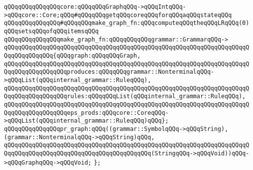 \verb|qQQqqQQqqQQqqQQqcore:qQQqqQQqGraphqQQq->qQQqIntqQQq->qQQqcore::Core;qQQq#qQQqqQQqgetqQQqcoreqQQqforqQQqaqQQqstateqQQq|\newline
\newline
\verb|qQQqqQQqqQQqqQQq#qQQqqQQqmake_graph_fn:qQQqcomputeqQQqtheqQQqLRqQQq(0)qQQqsetsqQQqofqQQqitemsqQQq|\newline
\newline
\verb|qQQqqQQqqQQqqQQqmake_graph_fn:qQQqqQQqqQQqgrammar::GrammarqQQq->|\newline
\verb|qQQqqQQqqQQqqQQqqQQqqQQqqQQqqQQqqQQqqQQqqQQqqQQqqQQqqQQqqQQqqQQqqQQqqQQqqQQqqQQqqQQq{qQQqgraph:qQQqqQQqGraph,|\newline
\verb|qQQqqQQqqQQqqQQqqQQqqQQqqQQqqQQqqQQqqQQqqQQqqQQqqQQqqQQqqQQqqQQqqQQqqQQqqQQqqQQqqQQqqQQqproduces:qQQqqQQqgrammar::NonterminalqQQq->qQQqList(qQQqinternal_grammar::RuleqQQq),|\newline
\verb|qQQqqQQqqQQqqQQqqQQqqQQqqQQqqQQqqQQqqQQqqQQqqQQqqQQqqQQqqQQqqQQqqQQqqQQqqQQqqQQqqQQqqQQqrules:qQQqqQQqList(qQQqinternal_grammar::RuleqQQq),|\newline
\verb|qQQqqQQqqQQqqQQqqQQqqQQqqQQqqQQqqQQqqQQqqQQqqQQqqQQqqQQqqQQqqQQqqQQqqQQqqQQqqQQqqQQqqQQqeps_prods:qQQqcore::CoreqQQq->qQQqList(qQQqinternal_grammar::RuleqQQq)qQQq};|\newline
\newline
\verb|qQQqqQQqqQQqqQQqpr_graph:qQQq((grammar::SymbolqQQq->qQQqString),(grammar::NonterminalqQQq->qQQqString)qQQq,|\newline
\verb|qQQqqQQqqQQqqQQqqQQqqQQqqQQqqQQqqQQqqQQqqQQqqQQqqQQqqQQqqQQqqQQqqQQqqQQqqQQqqQQqqQQqqQQqqQQqqQQqqQQqqQQqqQQqqQQq(StringqQQq->qQQqVoid))qQQq->qQQqGraphqQQq->qQQqVoid;|\newline
\verb|};|\newline
\newline

